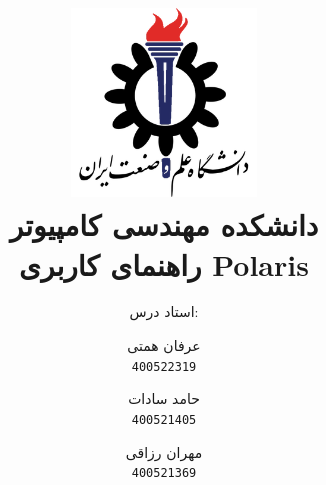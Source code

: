 \title{
    \center
    \includegraphics[width=5cm, height=5cm]{images/IUST_logo_color.png} \\
    دانشکده مهندسی کامپیوتر \\[25pt]     
راهنمای کاربری Polaris\\
\CourseName
}

\author{
    استاد درس:
    \Instructor \\[25pt]
}

\author{
  عرفان همتی\\
  \texttt{400522319}
  \and
  حامد سادات\\
  \texttt{400521405}
  \and
  مهران رزاقی\\
  \texttt{400521369}
}
\date{\Semester}